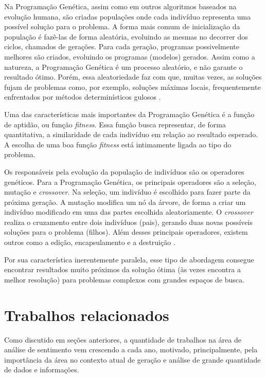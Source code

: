 \documentclass[12pt]{article}
\begin{document}
Na Programação Genética, assim como em outros algoritmos baseados na evolução humana, são criadas populações onde cada indivíduo representa uma possível solução para o problema. A forma mais comum de inicialização da população é fazê-las de forma aleatória, evoluindo as mesmas no decorrer dos ciclos, chamados de gerações. Para cada geração, programas possivelmente melhores são criados, evoluindo os programas (modelos) gerados. Assim como a natureza, a Programação Genética é um processo aleatório, e não garante o resultado ótimo. Porém, essa aleatoriedade faz com que, muitas vezes, as soluções fujam de problemas como, por exemplo, soluções máximas locais, frequentemente enfrentados por métodos determinísticos gulosos \cite{mcphee2008field}.

Uma das características mais importantes da Programação Genética é a função de aptidão, ou função \emph{fitness}. Essa função busca representar, de forma quantitativa, a similaridade de cada indivíduo em relação ao resultado esperado. A escolha de uma boa função \emph{fitness} está intimamente ligada ao tipo do problema.

Os responsáveis pela evolução da população de indivíduos são os operadores genéticos. Para a Programação Genética, os principais operadores são a seleção, mutação e \emph{crossover}. Na seleção, um indivíduo é escolhido para fazer parte da próxima geração. A mutação modifica um nó da árvore, de forma a criar um indivíduo modificado em uma das partes escolhida aleatoriamente. O \emph{crossover} realiza o cruzamento entre dois indivíduos (pais), gerando duas novas possíveis soluções para o problema (filhos). Além desses principais operadores, existem outros como a edição, encapsulamento e a destruição \cite{patelli2011genetic}.

Por sua característica inerentemente paralela, esse tipo de abordagem consegue encontrar resultados muito próximos da solução ótima (às vezes encontra a melhor resolução) para problemas complexos com grandes espaços de busca.

\section{Trabalhos relacionados}

\label{sec:bibl}

Como discutido em seções anteriores, a quantidade de trabalhos na área de análise de sentimento vem crescendo a cada ano, motivado, principalmente, pela importância da área no contexto atual de geração e análise de grande quantidade de dados e informações.
\end{document}
